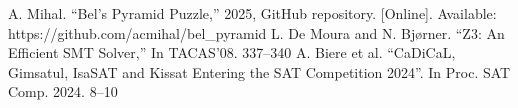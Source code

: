 \documentclass[conference]{IEEEtran}
\begin{document}
\begin{thebibliography}{0}
 A. Mihal. ``Bel's Pyramid Puzzle,'' 2025, GitHub repository. [Online]. Available: https://github.com/acmihal/bel\_pyramid
 L. De Moura and N. Bj{\o}rner. ``Z3: An Efficient SMT Solver,'' In TACAS'08. 337--340
 A. Biere et al. ``CaDiCaL, Gimsatul, IsaSAT and Kissat Entering the SAT Competition 2024''. In Proc. SAT Comp. 2024. 8--10
\end{thebibliography}
\end{document}
